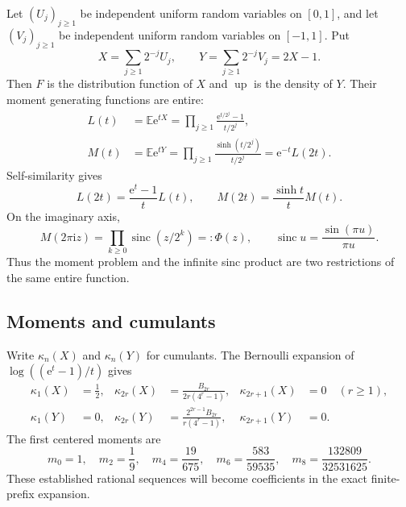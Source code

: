 \documentclass[11pt,oneside]{article}
\numberwithin{equation}{section}
\theoremstyle{definition}
\theoremstyle{remark}
\newcommand{\Up}{\operatorname{up}}
\newcommand{\sinc}{\operatorname{sinc}}
\newcommand{\e}{\mathrm e}
\newcommand{\ii}{\mathrm i}
\begin{document}
Let $(U_j)_{j\ge1}$ be independent uniform random variables on $[0,1]$, and let
$(V_j)_{j\ge1}$ be independent uniform random variables on $[-1,1]$.  Put
\begin{equation}
 X=\sum_{j\ge1}2^{-j}U_j,
 \qquad
 Y=\sum_{j\ge1}2^{-j}V_j=2X-1.
 \label{p2:eq:XY-series}
\end{equation}
Then $F$ is the distribution function of $X$ and $\Up$ is the density of $Y$.  Their moment
generating functions are entire:
\begin{align}
 L(t)&=\mathbb E\e^{tX}
 =\prod_{j\ge1}\frac{\e^{t/2^j}-1}{t/2^j},
 \label{p2:eq:L-def}\\
 M(t)&=\mathbb E\e^{tY}
 =\prod_{j\ge1}\frac{\sinh(t/2^j)}{t/2^j}
 =\e^{-t}L(2t).
 \label{p2:eq:M-def}
\end{align}
Self-similarity gives
\begin{equation}
 L(2t)=\frac{\e^t-1}{t}L(t),
 \qquad
 M(2t)=\frac{\sinh t}{t}M(t).
 \label{p2:eq:mgf-refinement}
\end{equation}
On the imaginary axis,
\begin{equation}
 M(2\pi\ii z)=\prod_{k\ge0}\sinc(z/2^k)=:\Phi(z),
 \qquad \sinc u=\frac{\sin(\pi u)}{\pi u}.
 \label{p2:eq:M-Phi}
\end{equation}
Thus the moment problem and the infinite sinc product are two restrictions of the same entire
function.

\subsection{Moments and cumulants}

Write $\kappa_n(X)$ and $\kappa_n(Y)$ for cumulants.  The Bernoulli expansion of
$\log((\e^t-1)/t)$ gives
\begin{align}
 \kappa_1(X)&=\frac12,
 &\kappa_{2r}(X)&=\frac{B_{2r}}{2r(4^r-1)},
 &\kappa_{2r+1}(X)&=0\quad(r\ge1),
 \label{p2:eq:X-cumulants}\\
 \kappa_1(Y)&=0,
 &\kappa_{2r}(Y)&=\frac{2^{2r-1}B_{2r}}{r(4^r-1)},
 &\kappa_{2r+1}(Y)&=0.
 \label{p2:eq:Y-cumulants}
\end{align}
The first centered moments are
\begin{equation}
 m_0=1,
 \quad m_2=\frac19,
 \quad m_4=\frac{19}{675},
 \quad m_6=\frac{583}{59535},
 \quad m_8=\frac{132809}{32531625}.
 \label{p2:eq:Y-moments}
\end{equation}
These established rational sequences will become coefficients in the exact finite-prefix expansion.
\end{document}
